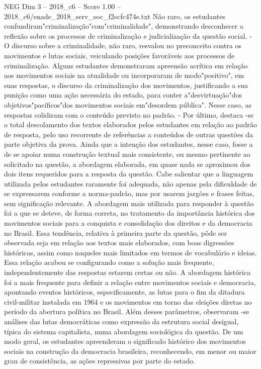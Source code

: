 \begin{textsample}{NEG Dim 3 – 2018\_c6 – Score 1.00 – 2018\_c6/enade\_2018\_serv\_soc\_f2ecfc474e.txt}
Não raro, os estudantes confundiram"criminalização"com"criminalidade", demonstrando desconhecer a reflexão sobre os processos de criminalização e judicialização da questão social. - O discurso sobre a criminalidade, não raro, resvalou no preconceito contra os movimentos e lutas sociais, veiculando posições favoráveis aos processos de criminalização.
Alguns estudantes demonstraram apreensão acrítica em relação aos movimentos sociais na atualidade ou incorporaram de modo"positivo", em suas respostas, o discurso da criminalização dos movimentos, justificando a sua punição como uma ação necessária do estado, para conter a"desvirtuação"dos objetivos"pacíficos"dos movimentos sociais em"desordem pública".
Nesse caso, as respostas colidiram com o conteúdo previsto no padrão. - Por último, destaca -se o total descolamento dos textos elaborados pelos estudantes em relação ao padrão de resposta, pelo uso recorrente de referências a conteúdos de outras questões da parte objetiva da prova.
Ainda que a intenção dos estudantes, nesse caso, fosse a de se apoiar numa construção textual mais consistente, ou mesmo pertinente ao solicitado na questão, a abordagem elaborada, em quase nada se aproximou dos dois itens requeridos para a resposta da questão.
Cabe salientar que a linguagem utilizada pelos estudantes raramente foi adequada, não apenas pela dificuldade de se expressarem conforme a norma-padrão, mas por usarem jargões e frases feitas, sem significação relevante.
A abordagem mais utilizada para responder à questão foi a que se deteve, de forma correta, no tratamento da importância histórica dos movimentos sociais para a conquista e consolidação dos direitos e da democracia no Brasil.
Essa tendência, relativa à primeira parte da questão, pôde ser observada seja em relação aos textos mais elaborados, com boas digressões históricas, assim como naqueles mais limitados em termos de vocabulário e ideias.
Essa relação acabou se configurando como a solução mais frequente, independentemente das respostas estarem certas ou não.
A abordagem histórica foi a mais frequente para definir a relação entre movimentos sociais e democracia, apontando eventos históricos, especificamente, as lutas para o fim da ditadura civil-militar instalada em 1964 e os movimentos em torno das eleições diretas no período da abertura política no Brasil.
Além desses parâmetros, observaram -se análises das lutas democráticas como expressão da estrutura social desigual, típica do sistema capitalista, numa abordagem sociológica da questão.
De um modo geral, os estudantes apreenderam o significado histórico dos movimentos sociais na construção da democracia brasileira, reconhecendo, em menor ou maior grau de consistência, as ações repressivas por parte do estado.

\end{textsample}
